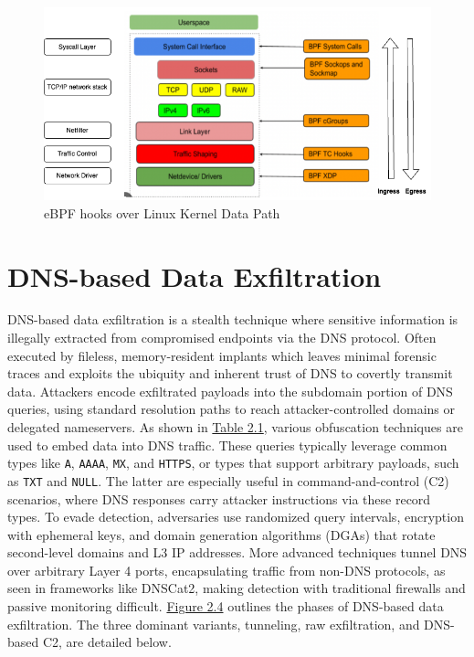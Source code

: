 \documentclass [11pt, proquest] {uwthesis}[2020/02/24]
\begin{document}




\begin{figure}
\includegraphics[width=1.0\textwidth]{images/kernel_datapath.png}
\caption{eBPF hooks over Linux Kernel Data Path}
\label{sec:ebpf-hooks-kernel-network-datapath}
\end{figure}


\section{DNS-based Data Exfiltration}
DNS-based data exfiltration is a stealth technique where sensitive information is illegally extracted from compromised endpoints via the DNS protocol. Often executed by fileless, memory-resident implants which leaves minimal forensic traces and exploits the ubiquity and inherent trust of DNS to covertly transmit data. Attackers encode exfiltrated payloads into the subdomain portion of DNS queries, using standard resolution paths to reach attacker-controlled domains or delegated nameservers. As shown in \hyperref[dns_payload_obfuscation]{Table 2.1}, various obfuscation techniques are used to embed data into DNS traffic. These queries typically leverage common types like \texttt{A}, \texttt{AAAA}, \texttt{MX}, and \texttt{HTTPS}, or types that support arbitrary payloads, such as \texttt{TXT} and \texttt{NULL}. The latter are especially useful in command-and-control (C2) scenarios, where DNS responses carry attacker instructions via these record types. To evade detection, adversaries use randomized query intervals, encryption with ephemeral keys, and domain generation algorithms (DGAs) that rotate second-level domains and L3 IP addresses. More advanced techniques tunnel DNS over arbitrary Layer 4 ports, encapsulating traffic from non-DNS protocols, as seen in frameworks like DNSCat2, making detection with traditional firewalls and passive monitoring difficult.
\hyperref[sec:dns c2 flow]{Figure 2.4} outlines the phases of DNS-based data exfiltration. The three dominant variants, tunneling, raw exfiltration, and DNS-based C2, are detailed below.
\end{document}
